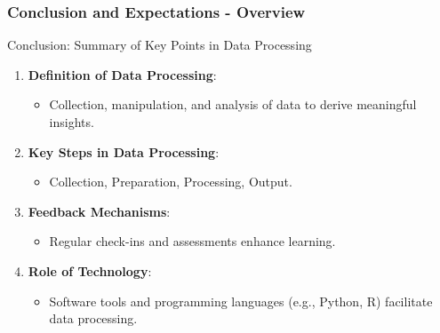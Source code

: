 \documentclass[aspectratio=169]{beamer}
\begin{document}
\begin{frame}[fragile]
    \frametitle{Conclusion and Expectations - Overview}
    \begin{block}{Conclusion: Summary of Key Points in Data Processing}
        \begin{enumerate}
            \item \textbf{Definition of Data Processing}:
            \begin{itemize}
                \item Collection, manipulation, and analysis of data to derive meaningful insights.
            \end{itemize}
            \item \textbf{Key Steps in Data Processing}:
            \begin{itemize}
                \item Collection, Preparation, Processing, Output.
            \end{itemize}
            \item \textbf{Feedback Mechanisms}:
            \begin{itemize}
                \item Regular check-ins and assessments enhance learning.
            \end{itemize}
            \item \textbf{Role of Technology}:
            \begin{itemize}
                \item Software tools and programming languages (e.g., Python, R) facilitate data processing.
            \end{itemize}
        \end{enumerate}
    \end{block}
\end{frame}
\end{document}

